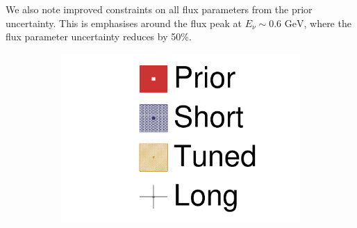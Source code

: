 We also note improved constraints on all flux parameters from the prior uncertainty. This is emphasises around the flux peak at $E_\nu \sim 0.6\text{ GeV}$, where the flux parameter uncertainty reduces by 50\%.
\begin{figure}[h]
	\begin{subfigure}[t]{0.10\textwidth}
		\includegraphics[width=\textwidth, trim={0mm 0mm 0mm 0mm}, clip,page=1]{figures/mach3/Asimov/2017_NewDet_Asimov_actually_0_2017b_NewDet_3Xsec_4Det_5Flux_NewXSecTune_Asimov_0_2017b_NewDet_NewData_Asimov_Long_0}
	\end{subfigure}


\end{figure}
